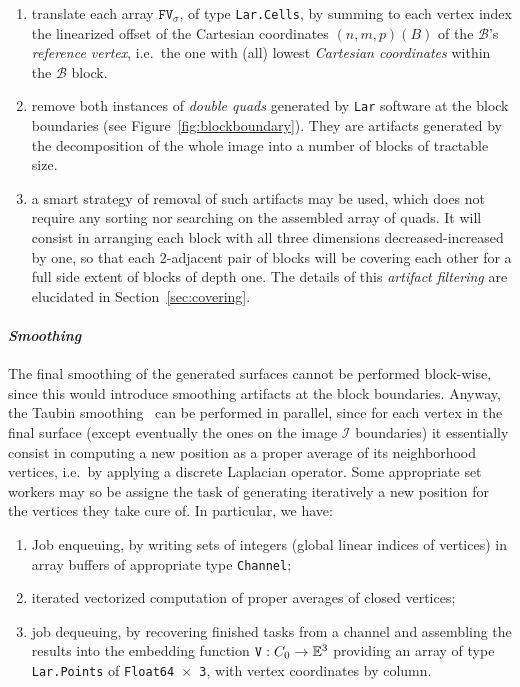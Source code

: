\documentclass[11pt, oneside]{amsart}   	%
\begin{document}
\begin{enumerate}

\item translate each array $\mathtt{FV}_\sigma$, of type \texttt{Lar.Cells}, by summing to each vertex index the linearized offset of the Cartesian coordinates $(n,m,p)(B)$ of the $\mathcal{B}$'s \emph{reference vertex}, i.e.~the one with (all) lowest \emph{Cartesian coordinates} within the $\mathcal{B}$ block.

\item remove both instances of \emph{double quads} generated by \texttt{Lar} software at the block boundaries (see Figure~\ref{fig:blockboundary}). They are artifacts generated by the decomposition of the whole image into a number of blocks of tractable size.

\item 
a smart strategy of removal of such artifacts may be used, which does not require any sorting nor searching on the assembled array of quads. It will consist in arranging each block with all three dimensions decreased-increased by one, so that each 2-adjacent pair of blocks will be covering each other for a full side extent of blocks of depth one. The details of this \emph{artifact filtering} are elucidated in Section~\ref{sec:covering}.

\end{enumerate}

\paragraph{\emph{Smoothing}}
The final smoothing of the generated surfaces cannot be performed block-wise, since this would introduce smoothing artifacts at the block boundaries. Anyway, the Taubin smoothing~\cite{} can be performed in parallel, since for each vertex in the final surface (except eventually the ones on the image $\mathcal{I}$ boundaries) it essentially consist in computing a new position as a proper average of its neighborhood vertices, i.e.~by applying a discrete Laplacian operator.  Some appropriate set workers may so be assigne the task of generating iteratively a new position for the vertices they take cure of. In particular, we have:
\begin{enumerate}

\item Job enqueuing, by writing sets of integers (global linear indices of vertices) in array buffers of appropriate type \texttt{Channel};

\item iterated vectorized computation of proper averages of closed vertices;

\item job dequeuing, by recovering finished tasks from a channel and assembling the results into the embedding function $\mathtt{V}: C_0 \to \mathbb{E}^3$ providing an array of type \texttt{Lar.Points} of \texttt{Float64 $\times$ 3}, with vertex coordinates by column.
\end{enumerate}
\end{document}
